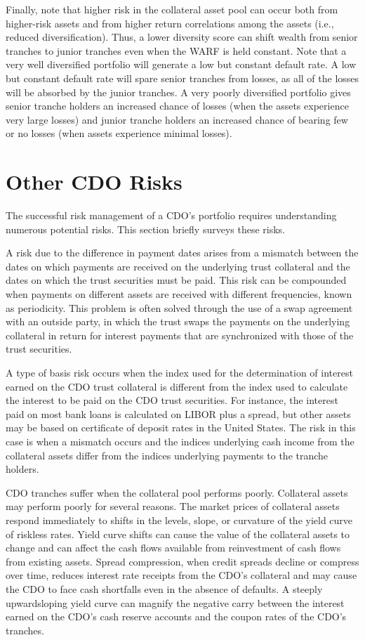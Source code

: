 \documentclass[11pt]{article}
\begin{document}
Finally, note that higher risk in the collateral asset pool can occur both from higher-risk assets and from higher return correlations among the assets (i.e., reduced diversification). Thus, a lower diversity score can shift wealth from senior tranches to junior tranches even when the WARF is held constant. Note that a very well diversified portfolio will generate a low but constant default rate. A low but constant default rate will spare senior tranches from losses, as all of the losses will be absorbed by the junior tranches. A very poorly diversified portfolio gives senior tranche holders an increased chance of losses (when the assets experience very large losses) and junior tranche holders an increased chance of bearing few or no losses (when assets experience minimal losses).

\section*{Other CDO Risks}
The successful risk management of a CDO's portfolio requires understanding numerous potential risks. This section briefly surveys these risks.

A risk due to the difference in payment dates arises from a mismatch between the dates on which payments are received on the underlying trust collateral and the dates on which the trust securities must be paid. This risk can be compounded when payments on different assets are received with different frequencies, known as periodicity. This problem is often solved through the use of a swap agreement with an outside party, in which the trust swaps the payments on the underlying collateral in return for interest payments that are synchronized with those of the trust securities.

A type of basis risk occurs when the index used for the determination of interest earned on the CDO trust collateral is different from the index used to calculate the interest to be paid on the CDO trust securities. For instance, the interest paid on most bank loans is calculated on LIBOR plus a spread, but other assets may be based on certificate of deposit rates in the United States. The risk in this case is when a mismatch occurs and the indices underlying cash income from the collateral assets differ from the indices underlying payments to the tranche holders.

CDO tranches suffer when the collateral pool performs poorly. Collateral assets may perform poorly for several reasons. The market prices of collateral assets respond immediately to shifts in the levels, slope, or curvature of the yield curve of riskless rates. Yield curve shifts can cause the value of the collateral assets to change and can affect the cash flows available from reinvestment of cash flows from existing assets. Spread compression, when credit spreads decline or compress over time, reduces interest rate receipts from the CDO's collateral and may cause the CDO to face cash shortfalls even in the absence of defaults. A steeply upwardsloping yield curve can magnify the negative carry between the interest earned on the CDO's cash reserve accounts and the coupon rates of the CDO's tranches.
\end{document}
